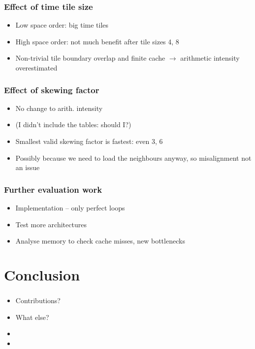 \documentclass{beamer}
\begin{document}
\begin{frame}
\frametitle{Effect of time tile size}

\begin{itemize}
	\item Low space order: big time tiles
	\item High space order: not much benefit after tile sizes 4, 8
	\item Non-trivial tile boundary overlap and finite cache \(\rightarrow\) arithmetic intensity overestimated
\end{itemize}
\end{frame}



\begin{frame}
\frametitle{Effect of skewing factor}

\begin{itemize}
	\item No change to arith. intensity
	\item (I didn't include the tables: should I?)
	\item Smallest valid skewing factor is fastest: even 3, 6
	\item Possibly because we need to load the neighbours anyway, so misalignment not an issue
\end{itemize}
\end{frame}



\begin{frame}
\frametitle{Further evaluation work}

\begin{itemize}
	\item Implementation -- only perfect loops
	\item Test more architectures
	\item Analyse memory to check cache misses, new bottlenecks
\end{itemize}
\end{frame}



\section{Conclusion}

\begin{frame}
\frametitle{}

\begin{itemize}
	\item Contributions?
	\item What else?
	\item 
	\item 
\end{itemize}
\end{frame}
\end{document}
